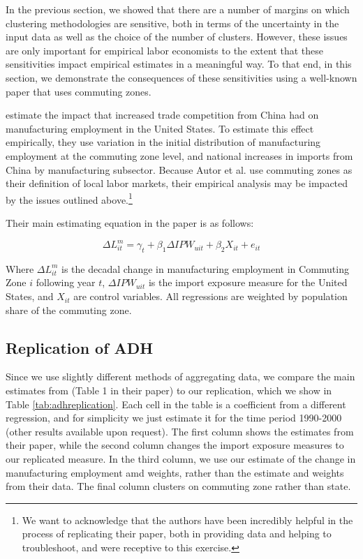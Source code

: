 In the previous section, we showed that there are a number of margins on which clustering methodologies
are sensitive, both in terms of the uncertainty in the input data as well as the choice of the number of
clusters. However, these issues are only important for empirical labor economists to the extent that these
sensitivities impact empirical estimates in a meaningful way. To that end, in this section, we demonstrate
the consequences of these sensitivities using a well-known paper that uses commuting zones.

\citet{ADH2013} estimate the impact that increased trade competition from China had on manufacturing
employment in the United States. To estimate this effect empirically, they use variation in the initial
distribution of manufacturing employment at the commuting zone level, and national increases in imports
from China by manufacturing subsector. Because Autor et al. use commuting zones as their definition of
local labor markets, their empirical analysis may be impacted by the issues outlined above.\footnote{We
want to acknowledge that the authors have been incredibly helpful in the process of replicating their
paper, both in providing data and helping to troubleshoot, and were receptive to this exercise.}

Their main estimating equation in the paper is as follows:

\begin{equation}\label{eqn:adh}
\Delta L_{it}^m = \gamma_t + \beta_1 \Delta IPW_{uit} + \beta_2 X_{it} + e_{it}
\end{equation}

Where $\Delta L_{it}^m$ is the decadal change in manufacturing employment in Commuting Zone $i$ following year $t$, $\Delta IPW_{uit}$ is the import exposure measure for the United States, and $X_{it}$ are control variables. All regressions are weighted by population share of the commuting zone.

\subsection{Replication of ADH}

Since we use slightly different methods of aggregating data, we compare the main estimates from \citet{ADH2013} (Table 1 in their paper) to our replication, which we show in Table \ref{tab:adhreplication}. Each cell in the table is a coefficient from a different regression, and for simplicity we just estimate it for the time period 1990-2000 (other results available upon request). The first column shows the estimates from their paper, while the second column changes the import exposure measures to our replicated measure. In the third column, we use our estimate of the change in manufacturing employment amd weights, rather than the estimate and weights from their data. The final column clusters on commuting zone rather than state.

